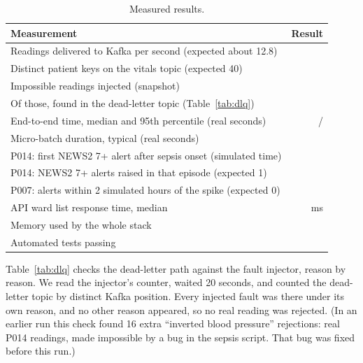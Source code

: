 \documentclass[11pt,a4paper]{article}
\begin{document}
\begin{table}[H]\centering\small
\begin{tabularx}{\linewidth}{|X|r|}
\hline
\rowcolor{tablehead}\textbf{Measurement} & \textbf{Result} \\ \hline
Readings delivered to Kafka per second (expected about 12.8) & \mThroughput{} \\ \hline
Distinct patient keys on the vitals topic (expected 40) & \mKeys{} \\ \hline
Impossible readings injected (snapshot) & \mInjected{} \\ \hline
Of those, found in the dead-letter topic (Table~\ref{tab:dlq}) & \mDeadLettered{} \\ \hline
End-to-end time, median and 95th percentile (real seconds) & \mLatencyPfifty{} / \mLatencyPninetyfive{} \\ \hline
Micro-batch duration, typical (real seconds) & \mBatchSeconds{} \\ \hline
P014: first NEWS2 7+ alert after sepsis onset (simulated time) & \mPfourteenDelay{} \\ \hline
P014: NEWS2 7+ alerts raised in that episode (expected 1) & \mPfourteenHighAlerts{} \\ \hline
P007: alerts within 2 simulated hours of the spike (expected 0) & \mPsevenAlerts{} \\ \hline
API ward list response time, median & \mApiMs{} ms \\ \hline
Memory used by the whole stack & \mMemory{} \\ \hline
Automated tests passing & \mTests{} \\ \hline
\end{tabularx}
\caption{Measured results.}\label{tab:results}
\end{table}

Table~\ref{tab:dlq} checks the dead-letter path against the fault injector, reason by
reason. We read the injector's counter, waited 20 seconds, and counted the dead-letter
topic by distinct Kafka position. Every injected fault was there under its own reason,
and no other reason appeared, so no real reading was rejected. (In an earlier run this
check found 16 extra ``inverted blood pressure'' rejections: real P014 readings, made
impossible by a bug in the sepsis script. That bug was fixed before this run.)
\end{document}
